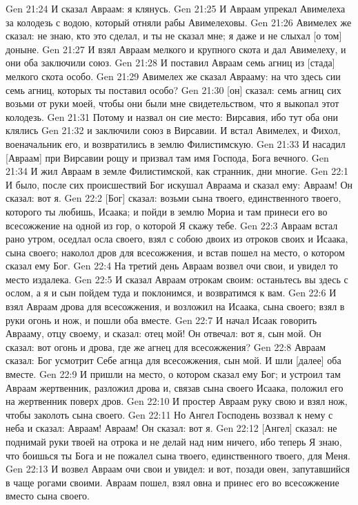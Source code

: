 Gen 21:24  И сказал Авраам: я клянусь.
Gen 21:25  И Авраам упрекал Авимелеха за колодезь с водою, который отняли рабы Авимелеховы.
Gen 21:26  Авимелех же сказал: не знаю, кто это сделал, и ты не сказал мне; я даже и не слыхал [о том] доныне.
Gen 21:27  И взял Авраам мелкого и крупного скота и дал Авимелеху, и они оба заключили союз.
Gen 21:28  И поставил Авраам семь агниц из [стада] мелкого скота особо.
Gen 21:29  Авимелех же сказал Аврааму: на что здесь сии семь агниц, которых ты поставил особо?
Gen 21:30  [он] сказал: семь агниц сих возьми от руки моей, чтобы они были мне свидетельством, что я выкопал этот колодезь.
Gen 21:31  Потому и назвал он сие место: Вирсавия, ибо тут оба они клялись
Gen 21:32  и заключили союз в Вирсавии. И встал Авимелех, и Фихол, военачальник его, и возвратились в землю Филистимскую.
Gen 21:33  И насадил [Авраам] при Вирсавии рощу и призвал там имя Господа, Бога вечного.
Gen 21:34  И жил Авраам в земле Филистимской, как странник, дни многие.
Gen 22:1  И было, после сих происшествий Бог искушал Авраама и сказал ему: Авраам! Он сказал: вот я.
Gen 22:2  [Бог] сказал: возьми сына твоего, единственного твоего, которого ты любишь, Исаака; и пойди в землю Мориа и там принеси его во всесожжение на одной из гор, о которой Я скажу тебе.
Gen 22:3  Авраам встал рано утром, оседлал осла своего, взял с собою двоих из отроков своих и Исаака, сына своего; наколол дров для всесожжения, и встав пошел на место, о котором сказал ему Бог.
Gen 22:4  На третий день Авраам возвел очи свои, и увидел то место издалека.
Gen 22:5  И сказал Авраам отрокам своим: останьтесь вы здесь с ослом, а я и сын пойдем туда и поклонимся, и возвратимся к вам.
Gen 22:6  И взял Авраам дрова для всесожжения, и возложил на Исаака, сына своего; взял в руки огонь и нож, и пошли оба вместе.
Gen 22:7  И начал Исаак говорить Аврааму, отцу своему, и сказал: отец мой! Он отвечал: вот я, сын мой. Он сказал: вот огонь и дрова, где же агнец для всесожжения?
Gen 22:8  Авраам сказал: Бог усмотрит Себе агнца для всесожжения, сын мой. И шли [далее] оба вместе.
Gen 22:9  И пришли на место, о котором сказал ему Бог; и устроил там Авраам жертвенник, разложил дрова и, связав сына своего Исаака, положил его на жертвенник поверх дров.
Gen 22:10  И простер Авраам руку свою и взял нож, чтобы заколоть сына своего.
Gen 22:11  Но Ангел Господень воззвал к нему с неба и сказал: Авраам! Авраам! Он сказал: вот я.
Gen 22:12  [Ангел] сказал: не поднимай руки твоей на отрока и не делай над ним ничего, ибо теперь Я знаю, что боишься ты Бога и не пожалел сына твоего, единственного твоего, для Меня.
Gen 22:13  И возвел Авраам очи свои и увидел: и вот, позади овен, запутавшийся в чаще рогами своими. Авраам пошел, взял овна и принес его во всесожжение вместо сына своего.
